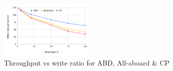 \begin{figure}[t]
  \centering
  \includegraphics[width=0.4\textwidth]{1_figures/abd-ab-cp.pdf}
  \caption{Throughput vs write ratio for ABD, All-aboard \& CP}
  \label{fig:abd-ab-cp}
\end{figure}